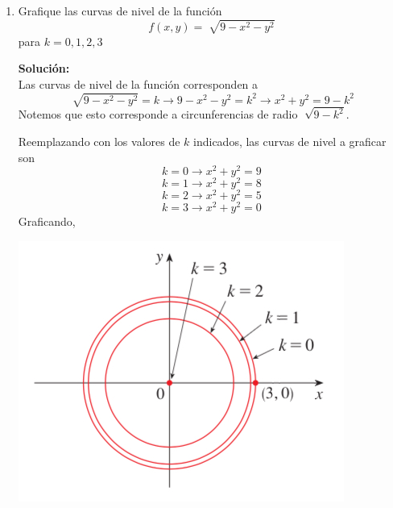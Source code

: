 \documentclass[12pt]{article}
\newenvironment{solucion}
{\begin{mdframed}[backgroundcolor=black!10]
		{\bf Solución:}\\
	}
	{
	\end{mdframed}
}
\newenvironment{preguntas}
{\begin{enumerate}\itemsep12pt
	}
	{
	\end{enumerate}
}
\newcommand{\ra}{\rightarrow}
\begin{document}
\begin{preguntas}
\begin{solucion}
\begin{enumerate}[a)]
\item $f(x,y) = x^2 + y^2 + 3$\\
\\
Notemos que los primeros dos terminos será siempre positivos y el menor valor que pueden tomar es 0.\\

Luego, el recorrido será
$$Rec(f) = [3, \infty)$$
\item $f(x,y,z) = \ln(\sqrt[]{x^2+y^2+4}) + z^2$\\
\\
El valor de la raiz que se encuentra dentro del logaritmo será a lo menos 2, ya que los primeros dos terminos pueden tomar mínimo 0 y luego quedará el 4. Luego, el mínimo valor del logaritmo será $\ln(2)$.\\
\\
Por otro lado, $z^2$ será a lo menos 0, con lo que el recorrido que nos queda es
$$Rec(f) = [\ln(2), \infty)$$
\end{enumerate}
\end{solucion}
\item Grafique las curvas de nivel de la función 
	$$ f(x,y) = \sqrt[]{9-x^2-y^2}$$
	para $k=0,1,2,3$
\begin{solucion}

		Las curvas de nivel de la función corresponden a
		$$\sqrt[]{9-x^2-y^2} = k \ra 9-x^2-y^2 = k^2 \ra x^2+y^2 = 9-k^2$$
		Notemos que esto corresponde a circunferencias de radio $\sqrt[]{9-k^2}$.
		
		Reemplazando con los valores de $k$ indicados, las curvas de nivel a graficar son
		$$k = 0 \ra x^2+y^2 = 9$$
		$$k = 1 \ra x^2+y^2 = 8$$
		$$k = 2 \ra x^2+y^2 = 5$$
		$$k = 3 \ra x^2+y^2 = 0$$
		Graficando,
		
		\begin{center}
			\includegraphics[scale=0.4]{../../../../img/curvasdenivel}			
		\end{center}
\end{solucion}
\end{preguntas}
\end{document}
